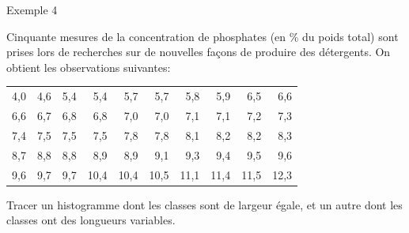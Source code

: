 \documentclass{BeamerTemplate}
\begin{document}

\begin{frame}[t]{Exemple 4}

{\small
Cinquante mesures de la concentration de phosphates (en \% du poids total)  sont prises lors de recherches sur de nouvelles fa\c{c}ons de produire des détergents. On obtient les observations suivantes:\\
\bigskip
\begin{center}
    \begin{tabular}{rrrrr rrrrr}
4,0 & 4,6 & 5,4 & 5,4  & 5,7  & 5,7  & 5,8  & 5,9  & 6,5  & 6,6 \\
6,6 & 6,7 & 6,8 & 6,8  & 7,0  & 7,0  & 7,1  & 7,1  & 7,2  & 7,3  \\
7,4 & 7,5 & 7,5 & 7,5  & 7,8  & 7,8  & 8,1  & 8,2  & 8,2  & 8,3  \\
8,7 & 8,8 & 8,8 & 8,9  & 8,9  & 9,1  & 9,3  & 9,4  & 9,5  & 9,6  \\
9,6 & 9,7 & 9,7 & 10,4 & 10,4 & 10,5 & 11,1 & 11,4 & 11,5 & 12,3\\
\end{tabular}
\end{center}


\bigskip

Tracer un histogramme dont les classes sont de largeur égale, et un autre dont les classes ont des longueurs variables.
}
\end{frame}
\end{document}
